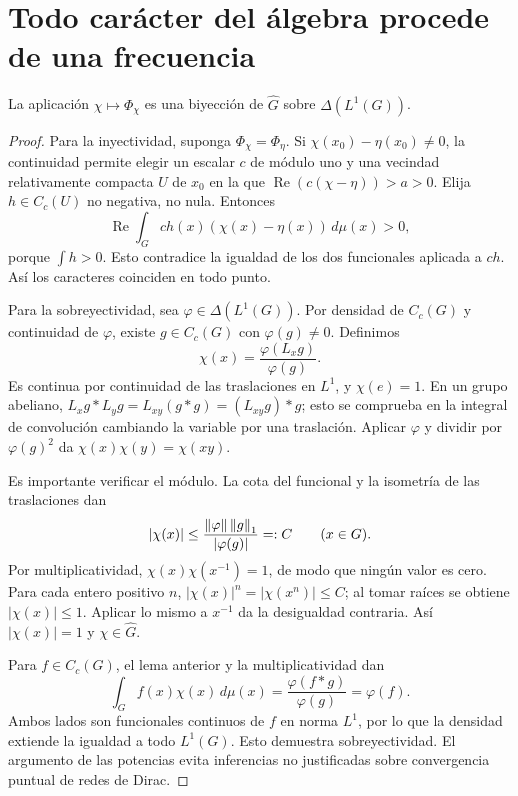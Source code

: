\section{Todo carácter del álgebra procede de una frecuencia}
\begin{teorema}\label{v4:espectro-luno-biyeccion}
La aplicación $\chi\mapsto\Phi_\chi$ es una biyección de $\widehat G$ sobre $\Delta(L^1(G))$.
\end{teorema}
\begin{proof}
Para la inyectividad, suponga $\Phi_\chi=\Phi_\eta$. Si $\chi(x_0)-\eta(x_0)\ne0$, la continuidad permite elegir un escalar $c$ de módulo uno y una vecindad relativamente compacta $U$ de $x_0$ en la que $\operatorname{Re}(c(\chi-\eta))>a>0$. Elija $h\in C_c(U)$ no negativa, no nula. Entonces
\[
 \operatorname{Re}\int_G ch(x)(\chi(x)-\eta(x))\,d\mu(x)>0,
\]
porque $\int h>0$. Esto contradice la igualdad de los dos funcionales aplicada a $ch$. Así los caracteres coinciden en todo punto.

Para la sobreyectividad, sea $\varphi\in\Delta(L^1(G))$. Por densidad de $C_c(G)$ y continuidad de $\varphi$, existe $g\in C_c(G)$ con $\varphi(g)\ne0$. Definimos
\[
 \chi(x)=\frac{\varphi(L_xg)}{\varphi(g)}.
\]
Es continua por continuidad de las traslaciones en $L^1$, y $\chi(e)=1$. En un grupo abeliano,
$L_xg*L_yg=L_{xy}(g*g)=(L_{xy}g)*g$; esto se comprueba en la integral de convolución cambiando la variable por una traslación. Aplicar $\varphi$ y dividir por $\varphi(g)^2$ da $\chi(x)\chi(y)=\chi(xy)$.

Es importante verificar el módulo. La cota del funcional y la isometría de las traslaciones dan
\[
 |\chi(x)|\le\frac{\left\lVert\varphi\right\rVert\left\lVert g\right\rVert_1}{|\varphi(g)|}=:C
 \qquad(x\in G).
\]
Por multiplicatividad, $\chi(x)\chi(x^{-1})=1$, de modo que ningún valor es cero. Para cada entero positivo $n$, $|\chi(x)|^n=|\chi(x^n)|\le C$; al tomar raíces se obtiene $|\chi(x)|\le1$. Aplicar lo mismo a $x^{-1}$ da la desigualdad contraria. Así $|\chi(x)|=1$ y $\chi\in\widehat G$.

Para $f\in C_c(G)$, el lema anterior y la multiplicatividad dan
\[
 \int_Gf(x)\chi(x)\,d\mu(x)
 =\frac{\varphi(f*g)}{\varphi(g)}=\varphi(f).
\]
Ambos lados son funcionales continuos de $f$ en norma $L^1$, por lo que la densidad extiende la igualdad a todo $L^1(G)$. Esto demuestra sobreyectividad. El argumento de las potencias evita inferencias no justificadas sobre convergencia puntual de redes de Dirac.
\end{proof}

